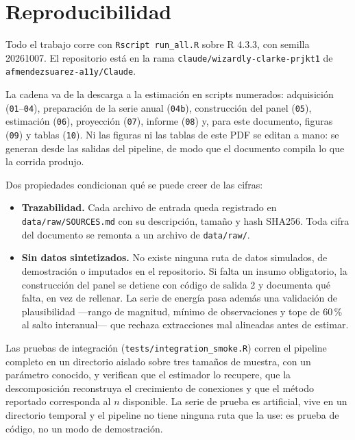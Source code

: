 \documentclass[11pt,a4paper]{article}
\begin{document}
\section{Reproducibilidad}

Todo el trabajo corre con \texttt{Rscript run\_all.R} sobre R 4.3.3, con semilla
20261007. El repositorio está en la rama
\texttt{claude/wizardly-clarke-prjkt1} de \texttt{afmendezsuarez-a11y/Claude}.

La cadena va de la descarga a la estimación en scripts numerados: adquisición
(\texttt{01}--\texttt{04}), preparación de la serie anual (\texttt{04b}),
construcción del panel (\texttt{05}), estimación (\texttt{06}), proyección
(\texttt{07}), informe (\texttt{08}) y, para este documento, figuras
(\texttt{09}) y tablas (\texttt{10}). Ni las figuras ni las tablas de este PDF
se editan a mano: se generan desde las salidas del pipeline, de modo que el
documento compila lo que la corrida produjo.

Dos propiedades condicionan qué se puede creer de las cifras:

\begin{itemize}
  \item \textbf{Trazabilidad.} Cada archivo de entrada queda registrado en
  \texttt{data/raw/SOURCES.md} con su descripción, tamaño y hash SHA256. Toda
  cifra del documento se remonta a un archivo de \texttt{data/raw/}.
  \item \textbf{Sin datos sintetizados.} No existe ninguna ruta de datos
  simulados, de demostración o imputados en el repositorio. Si falta un insumo
  obligatorio, la construcción del panel se detiene con código de salida 2 y
  documenta qué falta, en vez de rellenar. La serie de energía pasa además una
  validación de plausibilidad ---rango de magnitud, mínimo de observaciones y
  tope de $60$\,\% al salto interanual--- que rechaza extracciones mal alineadas
  antes de estimar.
\end{itemize}

Las pruebas de integración (\texttt{tests/integration\_smoke.R}) corren el
pipeline completo en un directorio aislado sobre tres tamaños de muestra, con un
parámetro conocido, y verifican que el estimador lo recupere, que la
descomposición reconstruya el crecimiento de conexiones y que el método
reportado corresponda al $n$ disponible. La serie de prueba es artificial, vive
en un directorio temporal y el pipeline no tiene ninguna ruta que la use: es
prueba de código, no un modo de demostración.
\end{document}
